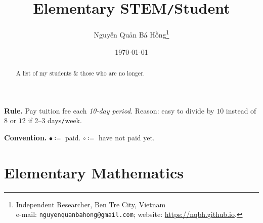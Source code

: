 \documentclass{article}
\title{Elementary STEM\texttt{/}Student}
\author{\selectlanguage{vietnamese} Nguyễn Quản Bá Hồng\footnote{Independent Researcher, Ben Tre City, Vietnam\\e-mail: \texttt{nguyenquanbahong@gmail.com}; website: \url{https://nqbh.github.io}.}}
\date{\today}
\numberwithin{equation}{section}
\begin{document}
\maketitle
{}
\begin{abstract}
	A list of my students \& those who are no longer.
\end{abstract}
\tableofcontents
\newpage


\textbf{Rule.} Pay tuition fee each \textit{10-day period}. Reason: easy to divide by $10$ instead of $8$ or $12$ if 2--3 days\texttt{/}week.

\textbf{Convention.} $\bullet\coloneq$ paid. $\circ\coloneq$ have not paid yet. 

\section{Elementary Mathematics}
\end{document}
